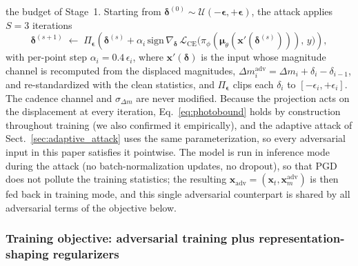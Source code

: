 \documentclass{aa}
\begin{document}
the budget of Stage~1. Starting from $\boldsymbol{\delta}^{(0)} \sim \mathcal{U}(-\boldsymbol{\epsilon}, +\boldsymbol{\epsilon})$, the attack applies $S = 3$ iterations
\begin{equation}
\label{eq:inner_pgd}
\boldsymbol{\delta}^{(s+1)} \;\leftarrow\; \Pi_{\boldsymbol{\epsilon}}\!\left(\boldsymbol{\delta}^{(s)} + \alpha_i \, \mathrm{sign}\,\nabla_{\boldsymbol{\delta}}\, \mathcal{L}_{\mathrm{CE}}\big(\pi_\phi(\boldsymbol{\mu}_\theta(\mathbf{x}'(\boldsymbol{\delta}^{(s)}))),\, y\big)\right),
\end{equation}
with per-point step $\alpha_i = 0.4\,\epsilon_i$, where $\mathbf{x}'(\boldsymbol{\delta})$ is the input whose magnitude channel is recomputed from the displaced magnitudes, $\Delta m^{\mathrm{adv}}_i = \Delta m_i + \delta_i - \delta_{i-1}$, and re-standardized with the clean statistics, and $\Pi_{\boldsymbol{\epsilon}}$ clips each $\delta_i$ to $[-\epsilon_i, +\epsilon_i]$. The cadence channel and $\sigma_{\Delta m}$ are never modified. Because the projection acts on the displacement at every iteration, Eq.~\eqref{eq:photobound} holds by construction throughout training (we also confirmed it empirically), and the adaptive attack of Sect.~\ref{sec:adaptive_attack} uses the same parameterization, so every adversarial input in this paper satisfies it pointwise. The model is run in inference mode during the attack (no batch-normalization updates, no dropout), so that PGD does not pollute the training statistics; the resulting $\mathbf{x}_{\mathrm{adv}} = (\mathbf{x}_t, \mathbf{x}_m^{\mathrm{adv}})$ is then fed back in training mode, and this single adversarial counterpart is shared by all adversarial terms of the objective below.

\subsubsection{Training objective: adversarial training plus representation-shaping regularizers} \label{sec:loss}
\end{document}
